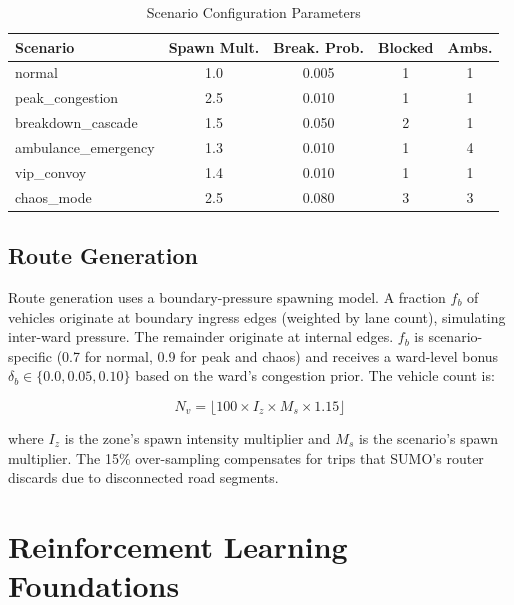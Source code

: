 \documentclass[conference]{IEEEtran}
\begin{document}
\begin{table}[!t]
\caption{Scenario Configuration Parameters}
\label{tab:scenarios}
\centering
\renewcommand{\arraystretch}{1.2}
\begin{tabular}{lcccc}
\toprule
\textbf{Scenario} & \textbf{Spawn Mult.} & \textbf{Break. Prob.} & \textbf{Blocked} & \textbf{Ambs.} \\
\midrule
normal              & 1.0 & 0.005 & 1 & 1 \\
peak\_congestion    & 2.5 & 0.010 & 1 & 1 \\
breakdown\_cascade  & 1.5 & 0.050 & 2 & 1 \\
ambulance\_emergency& 1.3 & 0.010 & 1 & 4 \\
vip\_convoy         & 1.4 & 0.010 & 1 & 1 \\
chaos\_mode         & 2.5 & 0.080 & 3 & 3 \\
\bottomrule
\end{tabular}
\end{table}

\subsection{Route Generation}

Route generation uses a boundary-pressure spawning model. A fraction
$f_b$ of vehicles originate at boundary ingress edges (weighted by lane count),
simulating inter-ward pressure. The remainder originate at internal edges.
$f_b$ is scenario-specific (0.7 for normal, 0.9 for peak and chaos) and
receives a ward-level bonus $\delta_b \in \{0.0, 0.05, 0.10\}$ based on
the ward's congestion prior. The vehicle count is:

\begin{equation}
N_v = \lfloor 100 \times I_z \times M_s \times 1.15 \rfloor
\label{eq:vehicle_count}
\end{equation}

where $I_z$ is the zone's spawn intensity multiplier and $M_s$ is the
scenario's spawn multiplier. The 15\% over-sampling compensates for trips
that SUMO's router discards due to disconnected road segments.

\section{Reinforcement Learning Foundations}
\label{sec:rl}
\end{document}
